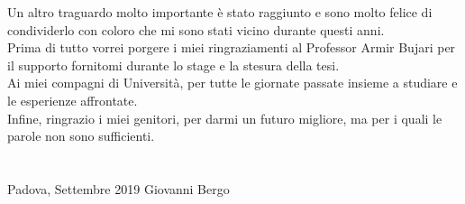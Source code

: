 
Un altro traguardo molto importante è stato raggiunto e sono molto felice di condividerlo con coloro che mi sono stati vicino durante questi anni.\\
\newline
Prima di tutto vorrei porgere i miei ringraziamenti al Professor Armir Bujari per il supporto fornitomi durante lo stage e la stesura della tesi.\\
\newline
Ai miei compagni di Università, per tutte le giornate passate insieme a studiare e le esperienze affrontate.\\
\newline
Infine, ringrazio i miei genitori, per darmi un futuro migliore, ma per i quali le parole non sono sufficienti.\\
\\
\\
Padova, Settembre 2019 \hfill Giovanni Bergo




